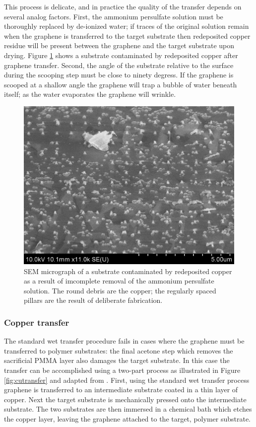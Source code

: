\documentclass[edeposit,fullpage,draftthesis]{uiucthesis2009}
\begin{document}
        This process is delicate, and in practice the quality of the transfer depends on several 
        analog factors. First, the ammonium persulfate solution must be thoroughly replaced by de-ionized water;
        if traces of the original solution remain when the graphene is transferred to the target substrate
        then redeposited copper residue will be present between the graphene and the target substrate upon drying. 
        Figure \ref{fig:bad_xfer_cu} shows a substrate contaminated by redeposited copper after graphene transfer.
        Second, the angle of the substrate relative to the surface during the scooping step must be close
        to ninety degress. If the graphene is scooped at a shallow angle the graphene will trap a bubble of water
        beneath itself; as the water evaporates the graphene will wrinkle.
        
         \begin{figure}
            \centering
            \includegraphics[width=0.4\linewidth]{images/experimentaltechniques/bad_xfer_cu.png}
            \caption[Copper contamination from bad graphene transfer]{
                SEM micrograph of a substrate contaminated by redeposited copper as a result of 
                imcomplete removal of the ammonium persulfate solution. The round debris are 
                the copper; the regularly spaced pillars are the result of deliberate fabrication.
            }
            \label{fig:bad_xfer_cu}
        \end{figure}


            \subsubsection{Copper transfer}
            
        The standard wet transfer procedure fails in cases where the graphene must be 
        transferred to polymer substrates: the final acetone step which removes the sacrificial
        PMMA layer also damages the target substrate.
        In this case the transfer can be accomplished using a two-part process as illustrated in
        Figure \ref{fig:cutransfer} and adapted from \cite{Lee2010}. First, using the standard wet transfer process
        graphene is transferred to an intermediate substrate coated in a thin layer of copper. Next the 
        target substrate is mechanically pressed onto the intermediate substrate. The two substrates
        are then immersed in a chemical bath which etches the copper layer, leaving the graphene
        attached to the target, polymer substrate.
        
\end{document}
